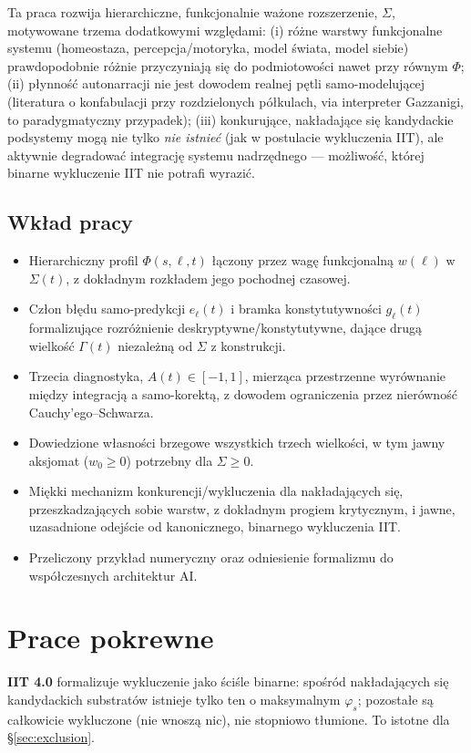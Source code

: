 \documentclass[11pt]{article}
\begin{document}
Ta praca rozwija hierarchiczne, funkcjonalnie ważone rozszerzenie, $\Sigma$, motywowane trzema dodatkowymi względami: (i) różne warstwy funkcjonalne systemu (homeostaza, percepcja/motoryka, model świata, model siebie) prawdopodobnie różnie przyczyniają się do podmiotowości nawet przy równym $\Phi$; (ii) płynność autonarracji nie jest dowodem realnej pętli samo-modelującej (literatura o konfabulacji przy rozdzielonych półkulach, via interpreter Gazzanigi, to paradygmatyczny przypadek); (iii) konkurujące, nakładające się kandydackie podsystemy mogą nie tylko \emph{nie istnieć} (jak w postulacie wykluczenia IIT), ale aktywnie degradować integrację systemu nadrzędnego --- możliwość, której binarne wykluczenie IIT nie potrafi wyrazić.

\subsection*{Wkład pracy}
\begin{itemize}[leftmargin=*]
\item Hierarchiczny profil $\Phi(s,\ell,t)$ łączony przez wagę funkcjonalną $w(\ell)$ w $\Sigma(t)$, z dokładnym rozkładem jego pochodnej czasowej.
\item Człon błędu samo-predykcji $e_\ell(t)$ i bramka konstytutywności $g_\ell(t)$ formalizujące rozróżnienie deskryptywne/konstytutywne, dające drugą wielkość $\Gamma(t)$ niezależną od $\Sigma$ z konstrukcji.
\item Trzecia diagnostyka, $A(t)\in[-1,1]$, mierząca przestrzenne wyrównanie między integracją a samo-korektą, z dowodem ograniczenia przez nierówność Cauchy'ego--Schwarza.
\item Dowiedzione własności brzegowe wszystkich trzech wielkości, w tym jawny aksjomat ($w_0\ge 0$) potrzebny dla $\Sigma\ge 0$.
\item Miękki mechanizm konkurencji/wykluczenia dla nakładających się, przeszkadzających sobie warstw, z dokładnym progiem krytycznym, i jawne, uzasadnione odejście od kanonicznego, binarnego wykluczenia IIT.
\item Przeliczony przykład numeryczny oraz odniesienie formalizmu do współczesnych architektur AI.
\end{itemize}

\section{Prace pokrewne}

\textbf{IIT 4.0} \cite{albantakis2023} formalizuje wykluczenie jako ściśle binarne: spośród nakładających się kandydackich substratów istnieje tylko ten o maksymalnym $\varphi_s$; pozostałe są całkowicie wykluczone (nie wnoszą nic), nie stopniowo tłumione. To istotne dla \S\ref{sec:exclusion}.
\end{document}

